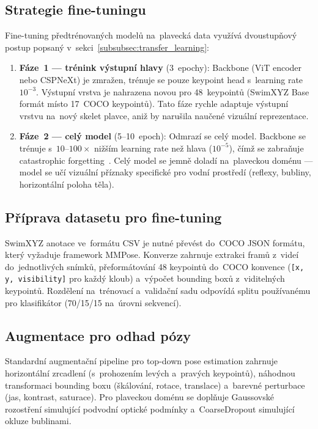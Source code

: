 \subsection{Strategie fine-tuningu}
\label{subsec:finetune_strategie}

Fine-tuning předtrénovaných modelů na~plavecká data využívá dvoustupňový postup popsaný v~sekci~\ref{subsubsec:transfer_learning}:

\begin{enumerate}
    \item \textbf{Fáze~1 --- trénink výstupní hlavy} (3~epochy): Backbone (ViT encoder nebo CSPNeXt) je zmražen, trénuje se pouze keypoint head s~learning rate $10^{-3}$. Výstupní vrstva je nahrazena novou pro 48~keypointů (SwimXYZ Base formát místo 17~COCO keypointů). Tato fáze rychle adaptuje výstupní vrstvu na~nový skelet plavce, aniž by narušila naučené vizuální reprezentace.

    \item \textbf{Fáze~2 --- celý model} (5--10~epoch): Odmrazí se celý model. Backbone se trénuje s~$10$--$100\times$ nižším learning rate než hlava ($10^{-5}$), čímž se zabraňuje catastrophic forgetting~\cite{yosinski2014transferable}. Celý model se jemně doladí na~plaveckou doménu --- model se učí vizuální příznaky specifické pro vodní prostředí (reflexy, bubliny, horizontální poloha těla).
\end{enumerate}

\subsection{Příprava datasetu pro fine-tuning}

SwimXYZ anotace ve~formátu CSV je nutné převést do~COCO JSON formátu, který vyžaduje framework MMPose. Konverze zahrnuje extrakci framů z~videí do~jednotlivých snímků, přeformátování 48 keypointů do~COCO konvence (\texttt{[x, y, visibility]} pro každý kloub) a~výpočet bounding boxů z~viditelných keypointů. Rozdělení na~trénovací a~validační sadu odpovídá splitu používanému pro klasifikátor (70/15/15 na~úrovni sekvencí).

\subsection{Augmentace pro odhad pózy}

Standardní augmentační pipeline pro top-down pose estimation zahrnuje horizontální zrcadlení (s~prohozením levých a~pravých keypointů), náhodnou transformaci bounding boxu (škálování, rotace, translace) a~barevné perturbace (jas, kontrast, saturace). Pro plaveckou doménu se doplňuje Gaussovské rozostření simulující podvodní optické podmínky a~CoarseDropout simulující okluze bublinami.

